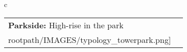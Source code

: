 \begin{table}[H]
        \begin{tabular}{c}
        \begin{tabular}{m{1.5in} m{2in}}
\textbf{Parkside:} {High-rise in the park} & \texttt{[image: \\rootpath/IMAGES/typology\_towerpark.png]}
\end{tabular}\end{tabular}
        \end{table}
